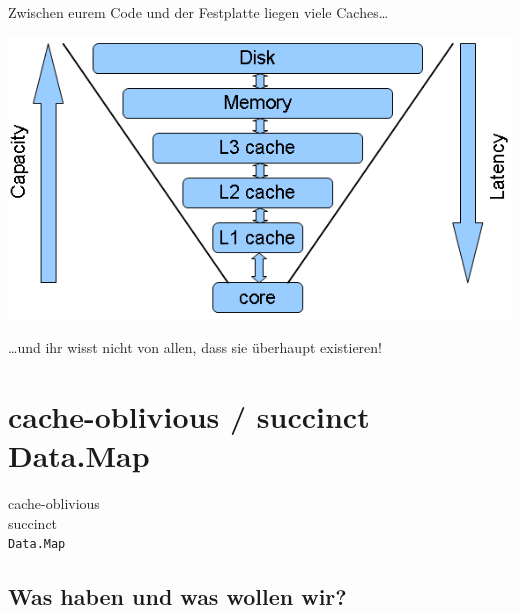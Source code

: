 \documentclass{beamer}
\begin{document}
\begin{frame}

Zwischen eurem Code und der Festplatte liegen viele Caches\dots

\begin{center}
\includegraphics[scale=0.35]{cpu_cache_structure.png} 
\end{center}
\pause

\dots und ihr wisst nicht von allen, dass sie überhaupt existieren!

\end{frame}


\section{cache-oblivious / succinct Data.Map}
\begin{frame}
\Large
\begin{center}
cache-oblivious\\
succinct\\
\texttt{Data.Map}
\end{center}
\normalsize
\end{frame}

\subsection{Was haben und was wollen wir?}
\end{document}
